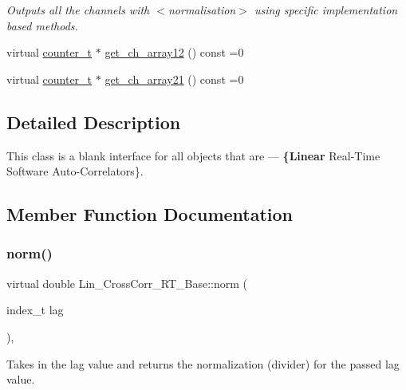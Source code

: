 \begin{DoxyCompactItemize}
\begin{DoxyCompactList}\small\item\em Outputs all the channels with {\bfseries } $<$normalisation$>$ using specific implementation based methods. \end{DoxyCompactList}\item 
virtual \hyperlink{types_8hpp_ac89ac912f524b3e3fa3720ea55fec966}{counter\+\_\+t} $\ast$ \hyperlink{group__Lin__CorrCorr__Base__Out_gacc777900e8d232740373a70c1d5b4cce}{get\+\_\+ch\+\_\+array12} () const =0
\item 
virtual \hyperlink{types_8hpp_ac89ac912f524b3e3fa3720ea55fec966}{counter\+\_\+t} $\ast$ \hyperlink{group__Lin__CorrCorr__Base__Out_ga9f075c765376a156da279b23bc18c07f}{get\+\_\+ch\+\_\+array21} () const =0
\end{DoxyCompactItemize}


\subsection{Detailed Description}
This class is a blank interface for all objects that are — {\bfseries \{Linear} Real-\/\+Time Software Auto-\/\+Correlators\}. 

\subsection{Member Function Documentation}
\mbox{\label{classLin__CrossCorr__RT__Base_a43779bc7fd546fa8f73713de4bd6e285}} 
\subsubsection{\texorpdfstring{norm()}{norm()}}
{\footnotesize\ttfamily virtual double Lin\+\_\+\+Cross\+Corr\+\_\+\+R\+T\+\_\+\+Base\+::norm (\begin{DoxyParamCaption}\item[{index\+\_\+t}]{lag }\end{DoxyParamCaption})\hspace{0.3cm}{\ttfamily [inline]}, {}}



Takes in the lag value and returns the normalization (divider) for the passed lag value. 

